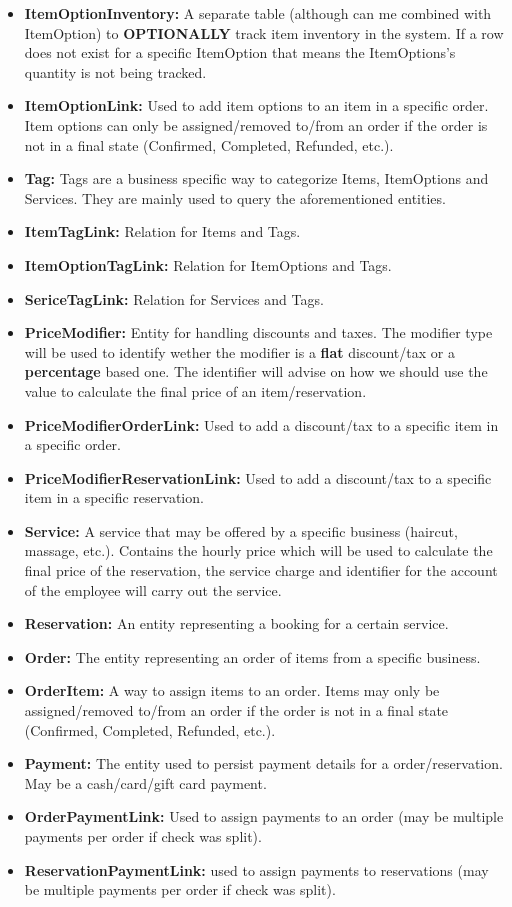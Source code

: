 \documentclass[11pt,a4paper,pdftex]{article}
\begin{document}
\begin{itemize}
    \item \textbf{ItemOptionInventory:} A separate table (although can me combined with ItemOption) to \textbf{OPTIONALLY} track item inventory in the system. If a row does not exist for a specific ItemOption that means the ItemOptions's quantity is not being tracked.
    \item \textbf{ItemOptionLink:} Used to add item options to an item in a specific order. Item options can only be assigned/removed to/from an order if the order is not in a final state (Confirmed, Completed, Refunded, etc.).
    \item \textbf{Tag:} Tags are a business specific way to categorize Items, ItemOptions and Services. They are mainly used to query the aforementioned entities.
    \item \textbf{ItemTagLink:} Relation for Items and Tags.
    \item \textbf{ItemOptionTagLink:} Relation for ItemOptions and Tags.
    \item \textbf{SericeTagLink:} Relation for Services and Tags.
    \item \textbf{PriceModifier:} Entity for handling discounts and taxes. The modifier type will be used to identify wether the modifier is a \textbf{flat} discount/tax or a \textbf{percentage} based one. The identifier will advise on how we should use the value to calculate the final price of an item/reservation.
    \item \textbf{PriceModifierOrderLink:} Used to add a discount/tax to a specific item in a specific order.
    \item \textbf{PriceModifierReservationLink:} Used to add a discount/tax to a specific item in a specific reservation.
    \item \textbf{Service:} A service that may be offered by a specific business (haircut, massage, etc.). Contains the hourly price which will be used to calculate the final price of the reservation, the service charge and identifier for the account of the employee will carry out the service.
    \item \textbf{Reservation:} An entity representing a booking for a certain service.
    \item \textbf{Order:} The entity representing an order of items from a specific business.
    \item \textbf{OrderItem:} A way to assign items to an order. Items may only be assigned/removed to/from an order if the order is not in a final state (Confirmed, Completed, Refunded, etc.).
    \item \textbf{Payment:} The entity used to persist payment details for a order/reservation. May be a cash/card/gift card payment.
    \item \textbf{OrderPaymentLink:} Used to assign payments to an order (may be multiple payments per order if check was split).
    \item \textbf{ReservationPaymentLink:} used to assign payments to reservations (may be multiple payments per order if check was split).
\end{itemize}
\end{document}
